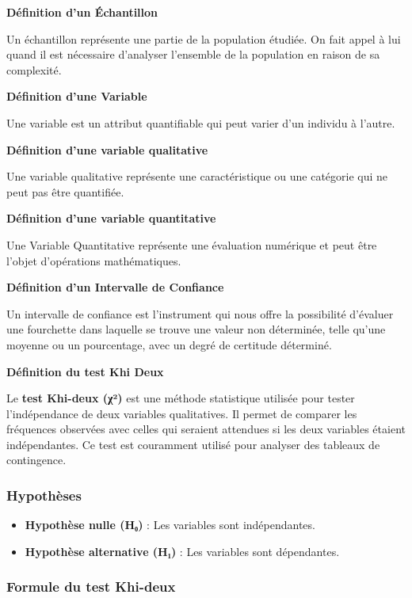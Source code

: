 \documentclass[
]{article}
\providecommand{\tightlist}{%
  \setlength{\itemsep}{0pt}\setlength{\parskip}{0pt}}
\begin{document}
\textbf{Définition d'un Échantillon}

Un échantillon représente une partie de la population étudiée. On fait
appel à lui quand il est nécessaire d'analyser l'ensemble de la
population en raison de sa complexité.

\textbf{Définition d'une Variable}

Une variable est un attribut quantifiable qui peut varier d'un individu
à l'autre.

\textbf{Définition d'une variable qualitative}

Une variable qualitative représente une caractéristique ou une catégorie
qui ne peut pas être quantifiée.

\textbf{Définition d'une variable quantitative}

Une Variable Quantitative représente une évaluation numérique et peut
être l'objet d'opérations mathématiques.

\textbf{Définition d'un Intervalle de Confiance}

Un intervalle de confiance est l'instrument qui nous offre la
possibilité d'évaluer une fourchette dans laquelle se trouve une valeur
non déterminée, telle qu'une moyenne ou un pourcentage, avec un degré de
certitude déterminé.

\textbf{Définition du test Khi Deux}

Le \textbf{test Khi-deux (χ²)} est une méthode statistique utilisée pour
tester l'indépendance de deux variables qualitatives. Il permet de
comparer les fréquences observées avec celles qui seraient attendues si
les deux variables étaient indépendantes. Ce test est couramment utilisé
pour analyser des tableaux de contingence.

\subsubsection{Hypothèses}\label{hypothuxe8ses}

\begin{itemize}
\tightlist
\item
  \textbf{Hypothèse nulle (H₀)} : Les variables sont indépendantes.
\item
  \textbf{Hypothèse alternative (H₁)} : Les variables sont dépendantes.
\end{itemize}

\subsubsection{Formule du test Khi-deux}\label{formule-du-test-khi-deux}
\end{document}
